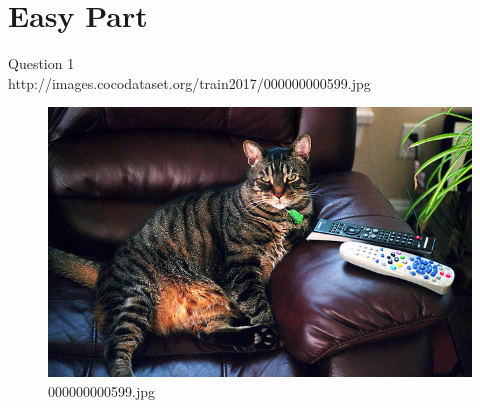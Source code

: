 \section{Easy Part}
Question 1\\
http://images.cocodataset.org/train2017/000000000599.jpg
    \begin{figure}[h]
        \centering
        \includegraphics[width=0.8\linewidth]{../image set/easy/000000000599.jpg}
        \caption{000000000599.jpg}
    \end{figure}

